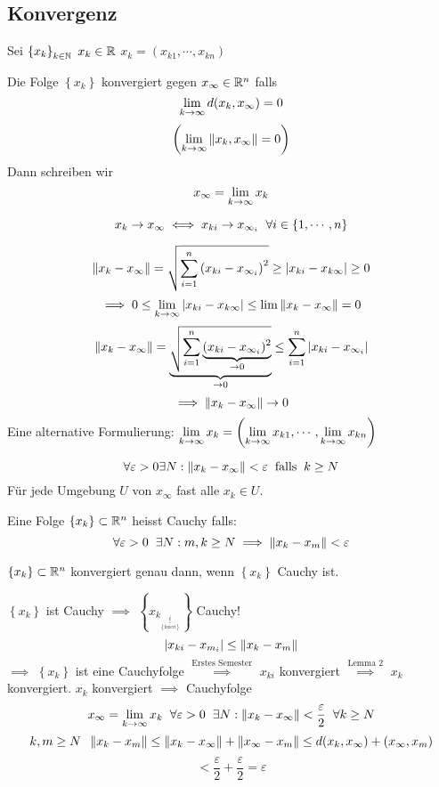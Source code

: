 \subsection{Konvergenz}
Sei $\left\{ x_k \right\}_{k\in\mathbb{N}}$ $x_k\in\mathbb{R}$ $x_k=\left( x_{k1}, \cdots, x_{kn} \right)$
\begin{Def}
  Die Folge $\left\{ x_k \right\}$ konvergiert gegen $x_\infty\in\mathbb{R}^n$ falls
  \[\displaystyle\lim_{k\rightarrow\infty}d(x_k,x_\infty)=0\]
  \[\left( \displaystyle\lim_{k\rightarrow\infty}\left\| x_k,x_\infty \right\|=0 \right)\]
  Dann schreiben wir
  \[x_\infty=\displaystyle\lim_{k\rightarrow\infty}x_k\]
\end{Def}
\begin{Sat}
  \[x_k\rightarrow x_\infty\iff x_{ki}\rightarrow x_{\infty_i}\hspace{2mm}\forall i\in\left\{ 1,\cdots,n \right\}\]
\end{Sat}
\begin{Bew}
  \[\left\| x_k - x_\infty \right\|=\sqrt{\sum_{i=1}^n\left( x_{ki}-x_{\infty_i} \right)^2}\geq \left| x_{ki}-x_{k\infty} \right|\geq 0\]
  \[\implies 0\leq \displaystyle\lim_{k\rightarrow\infty}\left| x_{ki}-x_{k\infty} \right|\leq \lim\left\| x_k-x_\infty \right\|=0\]
  \[\left\| x_k-x_\infty \right\|=\underbrace{\sqrt{\sum_{i=1}^n\underbrace{(x_{ki}-x_{\infty_i})^2}_{\rightarrow 0}}}_{\rightarrow 0}\leq \sum_{i=1}^n\left| x_{ki}-x_{\infty_i} \right|\]
  \[\implies \left\| x_k-x_\infty \right\|\rightarrow 0\]
  Eine alternative Formulierung: $\displaystyle\lim_{k\rightarrow\infty}x_k=\left( \displaystyle\lim_{k\rightarrow\infty} x_{k1},\cdots,\displaystyle\lim_{k\rightarrow\infty} x_{kn} \right)$
\end{Bew}
\begin{Bem}
  \[\forall \varepsilon>0 \exists N: \left\| x_k-x_\infty \right\|<\varepsilon\hspace{2mm}\text{falls}\hspace{2mm} k\geq N\]
  Für jede Umgebung $U$ von $x_\infty$ fast alle $x_k\in U$.
\end{Bem}
\begin{Def}
  Eine Folge $\left\{ x_k \right\}\subset\mathbb{R}^n$ heisst Cauchy falls:
  \[\forall \varepsilon>0\hspace{2mm}\exists N: m,k\geq N\implies \left\| x_k-x_m \right\|<\varepsilon\]
\end{Def}
\begin{Lem}
  $\left\{ x_k \right\}\subset\mathbb{R}^n$ konvergiert genau dann, wenn $\left\{ x_k \right\}$ Cauchy ist.
\end{Lem}
\begin{Bew}
  $\left\{ x_k \right\}$ ist Cauchy $\implies$ $\left\{ x_{k_{\underbrace{i}_{\left\{ \text{fixiert} \right\}}}} \right\}$ Cauchy!
  \[\left| x_{ki}-x_{m_i} \right|\leq\left\| x_k-x_m \right\|\]
  $\implies$ $\left\{ x_k \right\}$ ist eine Cauchyfolge $\stackrel{\text{Erstes Semester}}{\implies}$ $x_{ki}$ konvergiert $\stackrel{\text{Lemma 2}}{\implies}$ $x_k$ konvergiert. $x_k$ konvergiert $\implies$ Cauchyfolge
  \[x_\infty=\displaystyle\lim_{k\rightarrow\infty} x_k\hspace{2mm}\forall \varepsilon>0\hspace{2mm}\exists N:\left\| x_k-x_\infty \right\|<\frac{\varepsilon}{2}\hspace{2mm}\forall k\geq N\]
  \[k,m\geq N\hspace{2mm} \left\| x_k-x_m \right\|\leq \left\| x_k-x_\infty \right\|+\left\| x_\infty-x_m \right\|\leq d(x_k,x_\infty)+(x_\infty,x_m)\]
  \[<\frac{\varepsilon}{2}+\frac{\varepsilon}{2}=\varepsilon\]
\end{Bew}
